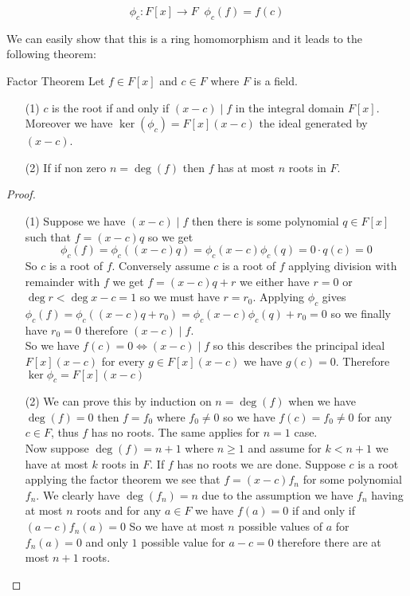 \documentclass[16pt,a4paper]{article}
\theoremstyle{definition}
\begin{document}
\[\phi_c : F[x] \rightarrow F \; \; \phi_c(f) = f(c)\]

We can easily show that this is a ring homomorphism and it leads to the following theorem:

\begin{thm}{Factor Theorem}{}
  Let $f\in F[x]$ and $c\in F$ where $F$ is a field. 
  \begin{itemize}
  \item[(1)] $c$ is the root if and only if $(x-c)\mid f$ in the integral domain $F[x]$. Moreover we have $\ker(\phi_c) = F[x](x-c)$ the ideal generated by $(x-c)$. 
  
  \item[(2)] If if non zero $n=\deg	(f)$ then $f$ has at most $n$ roots in $F$. 
  \end{itemize}
  \end{thm}  

\begin{proof}

\begin{itemize}
\item[(1)] Suppose we have $(x-c)\mid f$ then there is some polynomial $q\in F[x]$ such that $f=(x-c)q$ so we get 
\[\phi_c(f) = \phi_c((x-c)q) = \phi_c(x-c)\phi_c(q) = 0\cdot q(c) = 0\]
So $c$ is a root of $f$. Conversely assume $c$ is a root of $f$ applying division with remainder with $f$ we get $f=(x-c)q+r$  we either have $r=0$ or $\deg r < \deg x-c = 1$ so we must have $r=r_0$. Applying $\phi_c$ gives 
$\phi_c(f) = \phi_c ( (x-c)q + r_0) = \phi_c(x-c)\phi_c(q) + r_0 = 0$ so we finally have $r_0 = 0$ therefore $(x-c)\mid f$. 
\\
So we have $f(c) = 0 \iff (x-c)\mid f$ so this describes the principal ideal $F[x](x-c)$ for every $g\in F[x](x-c)$ we have $g(c) = 0$. Therefore $\ker\phi_c = F[x](x-c)$

\item[(2)] We can prove this by induction on $n=\deg (f)$ when we have $\deg(f) = 0$ then $f=f_0$ where $f_0\neq 0$ so we have $f(c) = f_0 \neq 0$ for any $c\in F$, thus $f$ has no roots. The same applies for $n=1$ case.
\\

Now suppose $\deg(f) = n+1$ where $n\geq 1$ and assume for $k < n+1$ we have at most $k$ roots in $F$. If $f$ has no roots we are done. Suppose $c$ is a root applying the factor theorem we see that $f=(x-c)f_n$ for some polynomial $f_n$. We clearly have $\deg(f_n) = n$ due to the assumption we have $f_n$ having at most $n$ roots and for any $a\in F$ we have $f(a)=0$ if and only if $(a-c)f_n(a) = 0$ So we have at most $n$ possible values of $a$ for $f_n(a) = 0$ and only $1$ possible value for $a-c=0$ therefore there are at most $n+1$ roots. 
\end{itemize}
\end{proof}
\end{document}
